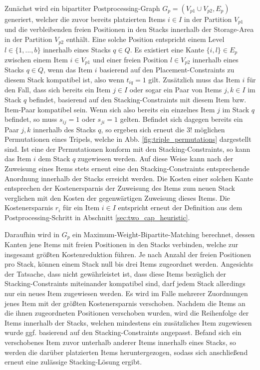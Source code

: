 Zunächst wird ein bipartiter Postprocessing-Graph $G_p = (V_{p1} \cup V_{p2}, E_p)$ generiert,
welcher die zuvor bereits platzierten Items $i \in I$ in der Partition $V_{p1}$ und die verbleibenden
freien Positionen in den Stacks innerhalb der Storage-Area in der Partition $V_{p2}$ enthält.
Eine solche Position entspricht einem Level $l \in \{1, ..., b\}$ innerhalb eines Stacks $q \in Q$.
Es existiert eine Kante $\{i, l\} \in E_p$ zwischen einem Item $i \in V_{p1}$ und einer freien
Position $l \in V_{p2}$ innerhalb eines Stacks $q \in Q$, wenn das Item $i$ basierend auf den Placement-Constraints
zu diesem Stack kompatibel ist, also wenn $t_{iq} = 1$ gilt.
Zusätzlich muss das Item $i$ für den Fall, dass sich bereits ein Item $j \in I$ oder sogar ein Paar von Items $j, k \in I$
im Stack $q$ befindet, basierend auf den Stacking-Constraints mit diesem Item bzw. Item-Paar kompatibel sein.
Wenn sich also bereits ein einzelnes Item $j$ im Stack $q$ befindet, so muss $s_{ij} = 1$ oder $s_{ji} = 1$ gelten.
Befindet sich dagegen bereits ein Paar $j, k$ innerhalb des Stacks $q$, so ergeben sich erneut die $3!$ möglichen Permutationen
eines Tripels, welche in Abb. \ref{fig:triple_permutations} dargestellt sind. Ist eine der Permutationen konform mit den Stacking-Constraints, so kann das Item $i$ dem Stack $q$ zugewiesen werden. Auf diese Weise kann nach der Zuweisung eines Items stets erneut eine den Stacking-Constraints entsprechende Anordnung innerhalb der Stacks erreicht werden.
Die Kosten einer solchen Kante entsprechen der Kostenersparnis der Zuweisung des Items zum neuen Stack verglichen mit den Kosten der gegenwärtigen Zuweisung dieses Items. Die Kostenersparnis $r_i$ für ein Item $i \in I$ entspricht erneut der Definition aus dem Postprocessing-Schritt in Abschnitt \ref{sec:two_cap_heuristic}.

Daraufhin wird in $G_p$ ein Maximum-Weight-Bipartite-Matching berechnet, dessen Kanten jene Items
mit freien Positionen in den Stacks verbinden, welche zur insgesamt größten Kostenreduktion führen.
Je nach Anzahl der freien Positionen pro Stack, können einem Stack null bis drei Items zugeordnet werden.
Angesichts der Tatsache, dass nicht gewährleistet ist, dass diese Items bezüglich der Stacking-Constraints miteinander kompatibel sind, darf jedem Stack allerdings nur ein neues Item zugewiesen werden.
Es wird im Falle mehrerer Zuordnungen jenes Item mit der größten Kostenersparnis verschoben.
Nachdem die Items an die ihnen zugeordneten Positionen verschoben wurden, wird die Reihenfolge der Items
innerhalb der Stacks, welchen mindestens ein zusätzliches Item zugewiesen wurde ggf. basierend auf den Stacking-Constraints angepasst. Befand sich ein verschobenes Item zuvor unterhalb anderer Items innerhalb eines Stacks, so werden die darüber platzierten Items heruntergezogen, sodass sich anschließend erneut eine zulässige Stacking-Lösung ergibt.


